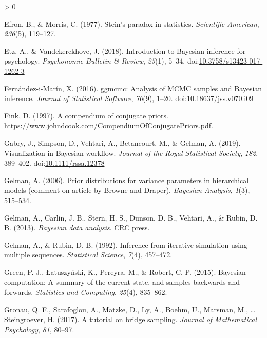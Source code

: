 \documentclass[
  english,
  doc,floatsintext]{apa6}
\newlength{\cslhangindent}
\newenvironment{CSLReferences}[2] %
 {%
  \setlength{\parindent}{0pt}
  \ifodd #1 \everypar{\setlength{\hangindent}{\cslhangindent}}\ignorespaces\fi
  \ifnum #2 > 0
  \setlength{\parskip}{#2\baselineskip}
  \fi
 }%
 {}
\begin{document}
\begin{CSLReferences}{1}{0}
\leavevmode\hypertarget{ref-efron1977stein}{}%
Efron, B., \& Morris, C. (1977). Stein's paradox in statistics. \emph{Scientific American}, \emph{236}(5), 119--127.

\leavevmode\hypertarget{ref-etz2018introduction}{}%
Etz, A., \& Vandekerckhove, J. (2018). Introduction to {Bayesian} inference for psychology. \emph{Psychonomic Bulletin \& Review}, \emph{25}(1), 5--34. doi:\href{https://doi.org/10.3758/s13423-017-1262-3}{10.3758/s13423-017-1262-3}

\leavevmode\hypertarget{ref-R-ggmcmc}{}%
Fernández-i-Marín, X. (2016). {ggmcmc}: Analysis of {MCMC} samples and {B}ayesian inference. \emph{Journal of Statistical Software}, \emph{70}(9), 1--20. doi:\href{https://doi.org/10.18637/jss.v070.i09}{10.18637/jss.v070.i09}

\leavevmode\hypertarget{ref-Fink1997}{}%
Fink, D. (1997). A compendium of conjugate priors. https://www.johndcook.com/CompendiumOfConjugatePriors.pdf.

\leavevmode\hypertarget{ref-R-bayesplot}{}%
Gabry, J., Simpson, D., Vehtari, A., Betancourt, M., \& Gelman, A. (2019). Visualization in {Bayesian} workflow. \emph{Journal of the Royal Statistical Society}, \emph{182}, 389--402. doi:\href{https://doi.org/10.1111/rssa.12378}{10.1111/rssa.12378}

\leavevmode\hypertarget{ref-gelman2006prior}{}%
Gelman, A. (2006). Prior distributions for variance parameters in hierarchical models (comment on article by {Browne} and {Draper}). \emph{Bayesian Analysis}, \emph{1}(3), 515--534.

\leavevmode\hypertarget{ref-gelman2013bayesian}{}%
Gelman, A., Carlin, J. B., Stern, H. S., Dunson, D. B., Vehtari, A., \& Rubin, D. B. (2013). \emph{Bayesian data analysis}. CRC press.

\leavevmode\hypertarget{ref-gelman1992inference}{}%
Gelman, A., \& Rubin, D. B. (1992). Inference from iterative simulation using multiple sequences. \emph{Statistical Science}, \emph{7}(4), 457--472.

\leavevmode\hypertarget{ref-green2015bayesian}{}%
Green, P. J., Łatuszyński, K., Pereyra, M., \& Robert, C. P. (2015). Bayesian computation: A summary of the current state, and samples backwards and forwards. \emph{Statistics and Computing}, \emph{25}(4), 835--862.

\leavevmode\hypertarget{ref-gronau2017tutorial}{}%
Gronau, Q. F., Sarafoglou, A., Matzke, D., Ly, A., Boehm, U., Marsman, M., \ldots{} Steingroever, H. (2017). A tutorial on bridge sampling. \emph{Journal of Mathematical Psychology}, \emph{81}, 80--97.


\end{CSLReferences}
\end{document}
